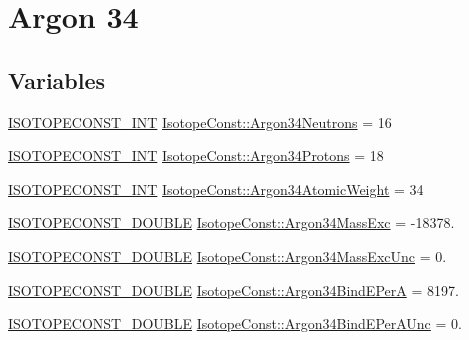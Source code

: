 \hypertarget{group___isotope_const-_argon-_ar34}{}\section{Argon 34}
\label{group___isotope_const-_argon-_ar34}
\subsection*{Variables}
\begin{DoxyCompactItemize}
\item 
\mbox{\hyperlink{group___isotope_const-_macros_ga5f18360b3e99483a35c32d789e62621c}{I\+S\+O\+T\+O\+P\+E\+C\+O\+N\+S\+T\+\_\+\+I\+NT}} \mbox{\hyperlink{group___isotope_const-_argon-_ar34_gaf0b1f6f8df25a63926a876ddef01b045}{Isotope\+Const\+::\+Argon34\+Neutrons}} = 16
\item 
\mbox{\hyperlink{group___isotope_const-_macros_ga5f18360b3e99483a35c32d789e62621c}{I\+S\+O\+T\+O\+P\+E\+C\+O\+N\+S\+T\+\_\+\+I\+NT}} \mbox{\hyperlink{group___isotope_const-_argon-_ar34_ga07a77b8a1a742790435db54a765e1721}{Isotope\+Const\+::\+Argon34\+Protons}} = 18
\item 
\mbox{\hyperlink{group___isotope_const-_macros_ga5f18360b3e99483a35c32d789e62621c}{I\+S\+O\+T\+O\+P\+E\+C\+O\+N\+S\+T\+\_\+\+I\+NT}} \mbox{\hyperlink{group___isotope_const-_argon-_ar34_ga5ea89b29a64fc6ef3ee2980fa48815a0}{Isotope\+Const\+::\+Argon34\+Atomic\+Weight}} = 34
\item 
\mbox{\hyperlink{group___isotope_const-_macros_ga8f45a7272ce02c0b4c65c44636ed719a}{I\+S\+O\+T\+O\+P\+E\+C\+O\+N\+S\+T\+\_\+\+D\+O\+U\+B\+LE}} \mbox{\hyperlink{group___isotope_const-_argon-_ar34_gabf060983df462367c20a3be853256e5d}{Isotope\+Const\+::\+Argon34\+Mass\+Exc}} = -\/18378.
\item 
\mbox{\hyperlink{group___isotope_const-_macros_ga8f45a7272ce02c0b4c65c44636ed719a}{I\+S\+O\+T\+O\+P\+E\+C\+O\+N\+S\+T\+\_\+\+D\+O\+U\+B\+LE}} \mbox{\hyperlink{group___isotope_const-_argon-_ar34_ga6af3ce35169dcfce423c1d4ce83ef473}{Isotope\+Const\+::\+Argon34\+Mass\+Exc\+Unc}} = 0.
\item 
\mbox{\hyperlink{group___isotope_const-_macros_ga8f45a7272ce02c0b4c65c44636ed719a}{I\+S\+O\+T\+O\+P\+E\+C\+O\+N\+S\+T\+\_\+\+D\+O\+U\+B\+LE}} \mbox{\hyperlink{group___isotope_const-_argon-_ar34_ga5fa33fff576fa7927b4a98baf07dbffb}{Isotope\+Const\+::\+Argon34\+Bind\+E\+PerA}} = 8197.
\item 
\mbox{\hyperlink{group___isotope_const-_macros_ga8f45a7272ce02c0b4c65c44636ed719a}{I\+S\+O\+T\+O\+P\+E\+C\+O\+N\+S\+T\+\_\+\+D\+O\+U\+B\+LE}} \mbox{\hyperlink{group___isotope_const-_argon-_ar34_ga11d0a2fcc36a9775e53b37cf6a6fad6e}{Isotope\+Const\+::\+Argon34\+Bind\+E\+Per\+A\+Unc}} = 0.

\end{DoxyCompactItemize}
